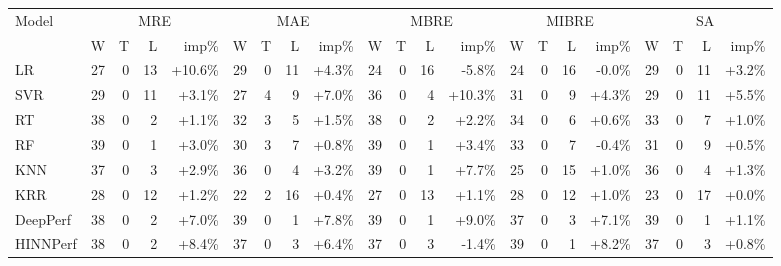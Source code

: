 \begin{tabular}{lrrrrrrrrrrrrrrrrrrrr}
\toprule
Model & \multicolumn{4}{c}{MRE} & \multicolumn{4}{c}{MAE} & \multicolumn{4}{c}{MBRE} & \multicolumn{4}{c}{MIBRE} & \multicolumn{4}{c}{SA} \\
& W & T & L & imp\% & W & T & L & imp\% & W & T & L & imp\% & W & T & L & imp\% & W & T & L & imp\% \\
\midrule
LR & 27 & 0 & 13 & +10.6\% & 29 & 0 & 11 & +4.3\% & 24 & 0 & 16 & -5.8\% & 24 & 0 & 16 & -0.0\% & 29 & 0 & 11 & +3.2\% \\
SVR & 29 & 0 & 11 & +3.1\% & 27 & 4 & 9 & +7.0\% & 36 & 0 & 4 & +10.3\% & 31 & 0 & 9 & +4.3\% & 29 & 0 & 11 & +5.5\% \\
RT & 38 & 0 & 2 & +1.1\% & 32 & 3 & 5 & +1.5\% & 38 & 0 & 2 & +2.2\% & 34 & 0 & 6 & +0.6\% & 33 & 0 & 7 & +1.0\% \\
RF & 39 & 0 & 1 & +3.0\% & 30 & 3 & 7 & +0.8\% & 39 & 0 & 1 & +3.4\% & 33 & 0 & 7 & -0.4\% & 31 & 0 & 9 & +0.5\% \\
KNN & 37 & 0 & 3 & +2.9\% & 36 & 0 & 4 & +3.2\% & 39 & 0 & 1 & +7.7\% & 25 & 0 & 15 & +1.0\% & 36 & 0 & 4 & +1.3\% \\
KRR & 28 & 0 & 12 & +1.2\% & 22 & 2 & 16 & +0.4\% & 27 & 0 & 13 & +1.1\% & 28 & 0 & 12 & +1.0\% & 23 & 0 & 17 & +0.0\% \\
DeepPerf & 38 & 0 & 2 & +7.0\% & 39 & 0 & 1 & +7.8\% & 39 & 0 & 1 & +9.0\% & 37 & 0 & 3 & +7.1\% & 39 & 0 & 1 & +1.1\% \\
HINNPerf & 38 & 0 & 2 & +8.4\% & 37 & 0 & 3 & +6.4\% & 37 & 0 & 3 & -1.4\% & 39 & 0 & 1 & +8.2\% & 37 & 0 & 3 & +0.8\% \\
\bottomrule
\end{tabular}
